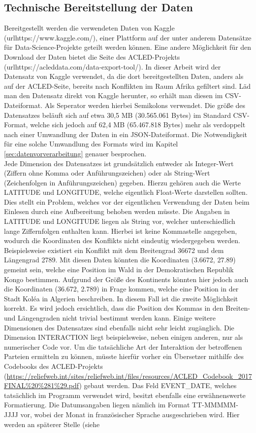 \documentclass[usegeometry=true]{scrartcl}
\begin{document}
\subsection{Technische Bereitstellung der Daten}

Bereitgestellt werden die verwendeten Daten von Kaggle (url{https://www.kaggle.com/}), einer Plattform auf der unter anderem Datensätze für Data-Science-Projekte geteilt werden können. Eine andere Möglichkeit für den Download der Daten bietet die Seite des ACLED-Projekts (url{https://acleddata.com/data-export-tool/}). In dieser Arbeit wird der Datensatz von Kaggle verwendet, da die dort bereitgestellten Daten, anders als auf der ACLED-Seite, bereits nach Konflikten im Raum Afrika gefiltert sind. Läd man den Datensatz direkt von Kaggle herunter, so erhält man diesen im CSV-Dateiformat. Als Seperator werden hierbei Semikolons verwendet. Die größe des Datensatzes beläuft sich auf etwa 30,5 MB (30.565.061 Bytes) im Standard CSV-Format, welche sich jedoch auf 62,4 MB (65.467.818 Bytes) mehr als verdoppelt nach einer Umwandlung der Daten in ein JSON-Dateiformat. Die Notwendigkeit für eine solche Umwandlung des Formats wird im Kapitel \ref{sec:datenvorverarbeitung} genauer besprochen.\\ Jede Dimension des Datensatzes ist grundsätzlich entweder als Integer-Wert (Ziffern ohne Komma oder Anführungszeichen) oder als String-Wert (Zeichenfolgen in Anführungszeichen) gegeben. Hierzu gehören auch die Werte LATITUDE und LONGITUDE, welche eigentlich Float-Werte darstellen sollten. Dies stellt ein Problem, welches vor der eigentlichen Verwendung der Daten beim Einlesen durch eine Aufbereitung behoben werden müsste. Die Angaben in LATITUDE und LONGITUDE liegen als String vor, welcher unterschiedlich lange Ziffernfolgen enthalten kann. Hierbei ist keine Kommastelle angegeben, wodurch die Koordinaten des Konflikts nicht eindeutig wiedergegeben werden. Beispielsweise existiert ein Konflikt mit dem Breitengrad 36672 und dem Längengrad 2789. Mit diesen Daten könnten die Koordinaten (3.6672, 27.89) gemeint sein, welche eine Position im Wald in der Demokratischen Republik Kongo bestimmen. Aufgrund der Größe des Kontinents könnten hier jedoch auch die Koordinaten (36.672, 2.789) in Frage kommen, welche eine Position in der Stadt Koléa in Algerien beschreiben. In diesem Fall ist die zweite Möglichkeit korrekt. Es wird jedoch ersichtlich, dass die Position des Kommas in den Breiten- und Längengraden nicht trivial bestimmt werden kann. Einige weitere Dimensionen des Datensatzes sind ebenfalls nicht sehr leicht zugänglich. Die Dimension INTERACTION liegt beispielsweise, neben einigen anderen, nur als numerischer Code vor. Um die tatsächliche Art der Interaktion der betroffenen Parteien ermitteln zu können, müsste hierfür vorher ein Übersetzer mithilfe des Codebooks des ACLED-Projekts (\url{https://reliefweb.int/sites/reliefweb.int/files/resources/ACLED_Codebook_2017FINAL%20%281%29.pdf}) gebaut werden. Das Feld EVENT\_DATE, welches tatsächlich im Programm verwendet wird, besitzt ebenfalls eine erwähnenswerte Formatierung. Die Datumsangaben liegen nämlich im Format \glqq TT-MMMMM-JJJJ\grqq{} vor, wobei der Monat in französischer Sprache ausgeschrieben wird. Hier werden an späterer Stelle (siehe 
\end{document}
